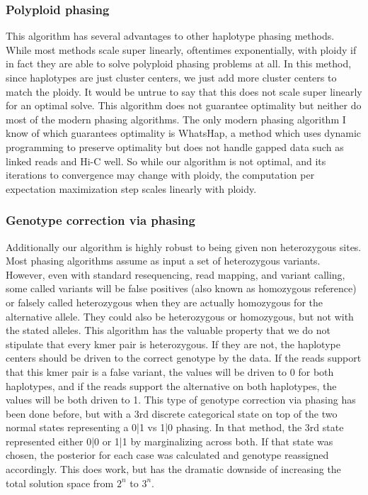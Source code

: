 \subsubsection{Polyploid phasing}
\par{
This algorithm has several advantages to other haplotype phasing methods. While most methods scale super linearly, oftentimes exponentially, with ploidy if in fact they are able to solve polyploid phasing problems at all. In this method, since haplotypes are just cluster centers, we just add more cluster centers to match the ploidy. It would be untrue to say that this does not scale super linearly for an optimal solve. This algorithm does not guarantee optimality but neither do most of the modern phasing algorithms. The only modern phasing algorithm I know of which guarantees optimality is WhatsHap, a method which uses dynamic programming to preserve optimality but does not handle gapped data such as linked reads and Hi-C well\cite{whatshap}. So while our algorithm is not optimal, and its iterations to convergence may change with ploidy, the computation per expectation maximization step scales linearly with ploidy.
}
\subsubsection{Genotype correction via phasing}

\par{
Additionally our algorithm is highly robust to being given non heterozygous sites. Most phasing algorithms assume as input a set of heterozygous variants. However, even with standard resequencing, read mapping, and variant calling, some called variants will be false positives (also known as homozygous reference) or falsely called heterozygous when they are actually homozygous for the alternative allele. They could also be heterozygous or homozygous, but not with the stated alleles. This algorithm has the valuable property that we do not stipulate that every kmer pair is heterozygous. If they are not, the haplotype centers should be driven to the correct genotype by the data. If the reads support that this kmer pair is a false variant, the values will be driven to 0 for both haplotypes, and if the reads support the alternative on both haplotypes, the values will be both driven to 1. This type of genotype correction via phasing has been done before, but with a 3rd discrete categorical state on top of the two normal states representing a 0|1 vs 1|0 phasing\cite{mypatent}. In that method, the 3rd state represented either 0|0 or 1|1 by marginalizing across both. If that state was chosen, the posterior for each case was calculated and genotype reassigned accordingly. This does work, but has the dramatic downside of increasing the total solution space from $2^n$ to $3^n$.
}


